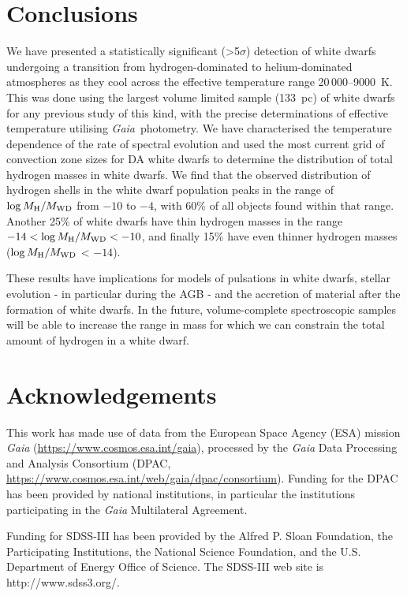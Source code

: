 \documentclass[a4paper,fleqn,usenatbib]{mnras}
\newcommand{\gaia}{{\it Gaia}}
\begin{document}
\section{Conclusions}
\label{conclusions}
We have presented a statistically significant (>5$\sigma$) detection of white dwarfs undergoing a transition from hydrogen-dominated to helium-dominated atmospheres as they cool across the effective temperature range 20\,000--9000~K. This was done using the largest volume limited sample (133~pc) of white dwarfs for any previous study of this kind, with the precise determinations of effective temperature utilising \gaia\ photometry. We have characterised the temperature dependence of the rate of spectral evolution and used the most current grid of convection zone sizes for DA white dwarfs to determine the distribution of total hydrogen masses in white dwarfs. We find that the observed distribution of hydrogen shells in the white dwarf population peaks in the range of $\log M_{\mathrm{H}}/M_{\rm WD}$ from $-10$ to $-4$, with 60\% of all objects found within that range. Another 25\% of white dwarfs have thin hydrogen masses in the range $-14 < \log M_{\mathrm{H}}/M_{\rm WD} < -10$, and finally 15\% have even thinner hydrogen masses ($\log M_{\mathrm{H}}/M_{\rm WD}$ < $-14$).

These results have implications for models of pulsations in white dwarfs, stellar evolution - in particular during the AGB - and the accretion of material after the formation of white dwarfs. In the future, volume-complete spectroscopic samples will be able to increase the range in mass for which we can constrain the total amount of hydrogen in a white dwarf.

\section*{Acknowledgements}
This work has made use of data from the European Space Agency (ESA) mission {\it Gaia} (\url{https://www.cosmos.esa.int/gaia}), processed by the {\it Gaia}
Data Processing and Analysis Consortium (DPAC, \url{https://www.cosmos.esa.int/web/gaia/dpac/consortium}). Funding for the DPAC has been provided by national institutions, in particular the institutions participating in the {\it Gaia} Multilateral Agreement.

Funding for SDSS-III has been provided by the Alfred P. Sloan Foundation, the Participating Institutions, the National Science Foundation, and the U.S. Department of Energy Office of Science. The SDSS-III web site is http://www.sdss3.org/.
\end{document}
